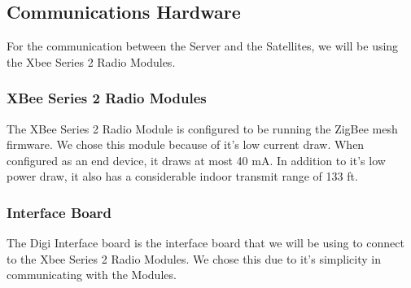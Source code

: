 
\subsection{Communications Hardware}

For the communication between the Server and the Satellites,
we will be using the Xbee Series 2 Radio Modules.

\subsubsection{XBee Series 2 Radio Modules}

The XBee Series 2 Radio Module is configured to be running
the ZigBee mesh firmware. We chose this module because of it's
low current draw. When configured as an end device, it draws at
most 40 mA. In addition to it's low power draw, it also has a 
considerable indoor transmit range of 133 ft.

\subsubsection{Interface Board}

The Digi Interface board is the interface board that we will
be using to connect to the Xbee Series 2 Radio Modules. We 
chose this due to it's simplicity in communicating with the
Modules.
